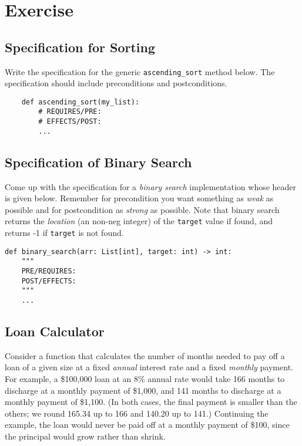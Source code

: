 \documentclass[oneside,11pt,dvipsnames]{book}
\newcommand{\code}[1]{\texttt{#1}}
\begin{document}
\section{Exercise}

\subsection{Specification for Sorting}
Write the specification for the generic \code{ascending\_sort} method below. The specification should include preconditions and postconditions.
\begin{lstlisting}
    def ascending_sort(my_list):
        # REQUIRES/PRE: 
        # EFFECTS/POST: 
        ...
\end{lstlisting}
    


\subsection{Specification of Binary Search}

Come up with the specification for a \emph{binary search} implementation whose header is given below. Remember for precondition you want something as \emph{weak} as possible and for postcondition as \emph{strong} as possible. Note that binary search returns the \emph{location} (an non-neg integer) of the \code{target} value if found, and returns -1 if \code{target} is not found. 

\begin{lstlisting}
def binary_search(arr: List[int], target: int) -> int:
    """
    PRE/REQUIRES: 
    POST/EFFECTS: 
    """
    ... 
\end{lstlisting}


\subsection{Loan Calculator}\label{ex:loan}    

Consider a function that calculates the number of months needed to pay off a loan of a given size at a fixed \emph{annual} interest rate and a fixed \emph{monthly} payment. For example, a \$100,000 loan at an 8\% annual rate would take 166 months to discharge at a monthly payment of \$1,000, and 141 months to discharge at a monthly payment of \$1,100. (In both cases, the final payment is smaller than the others; we round 165.34 up to 166 and 140.20 up to 141.) Continuing the example, the loan would never be paid off at a monthly payment of \$100, since the principal would grow rather than shrink.
\end{document}

